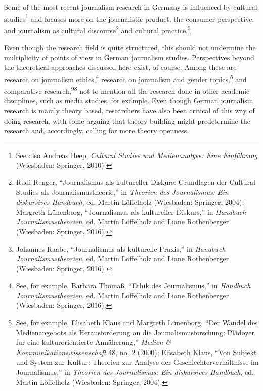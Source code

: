 \documentclass{tufte-handout}
\begin{document}
Some of the most recent journalism research in Germany is influenced by
cultural studies\footnote{See also Andreas Heep, \emph{Cultural Studies
  und Medienanalyse: Eine Einführung} (Wiesbaden: Springer, 2010).} and
focuses more on the journalistic product, the consumer perspective, and
journalism as cultural discourse\footnote{Rudi Renger, ``Journalismus
  als kultureller Diskurs: Grundlagen der Cultural Studies als
  Journalismustheorie,'' in \emph{Theorien des Journalismus: Ein
  diskursives Handbuch}, ed. Martin Löffelholz (Wiesbaden: Springer,
  2004); Margreth Lünenborg, ``Journalismus als kultureller Diskurs,''
  in \emph{Handbuch Journalismustheorien}, ed. Martin Löffelholz and
  Liane Rothenberger (Wiesbaden: Springer, 2016).} and cultural
practice.\footnote{Johannes Raabe, ``Journalismus als kulturelle
  Praxis,'' in \emph{Handbuch Journalismustheorien}, ed. Martin
  Löffelholz and Liane Rothenberger (Wiesbaden: Springer, 2016).}

Even though the research field is quite structured, this should not
undermine the multiplicity of points of view in German journalism
studies. Perspectives beyond the theoretical approaches discussed here
exist, of course. Among these are research on journalism
ethics,\footnote{See, for example, Barbara Thomaß, ``Ethik des
  Journalismus,'' in \emph{Handbuch Journalismustheorien}, ed. Martin
  Löffelholz and Liane Rothenberger (Wiesbaden: Springer, 2016).}
research on journalism and gender topics,\footnote{See, for example,
  Elisabeth Klaus and Margreth Lünenborg, ``Der Wandel des
  Medienangebots als Herausforderung an die Joumalismusforschung:
  Plädoyer fur eine kulturorientierte Annäherung,'' \emph{Medien \&
  Kommunikationswissenschaft} 48, no. 2 (2000); Elisabeth Klaus, ``Von
  Subjekt und System zur Kultur: Theorien zur Analyse der
  Geschlechterverhältnisse im Journalismus,'' in \emph{Theorien des
  Journalismus: Ein diskursives Handbuch}, ed. Martin Löffelholz
  (Wiesbaden: Springer, 2004).} and comparative research,\textsuperscript{98} not to
mention all the research done in other academic disciplines, such as
media studies, for example. Even though German journalism research is
mainly theory based, researchers have also been critical of this way of
doing research, with some arguing that theory building might
predetermine the research and, accordingly, calling for more theory
openness.
\end{document}
